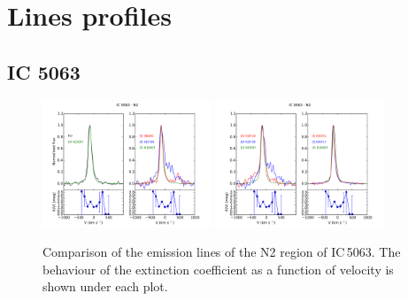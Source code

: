 \documentclass[../thesis.tex]{subfiles}
\begin{document}
\chapter{Lines profiles}
\label{cap:appendix1}

\section{IC 5063}

\begin{figure}
\centering
\includegraphics[width=0.45\textwidth]{images/paper1/IC5063_n2_l1.pdf} \quad
\includegraphics[width=0.45\textwidth]{images/paper1/IC5063_n2_l2.pdf}\\
\caption[]{Comparison of the emission lines of the N2 region of IC\,5063. The behaviour of the extinction coefficient as a function of velocity is shown under each plot.}
\label{fig:n2l1_I}
\end{figure}
\end{document}
